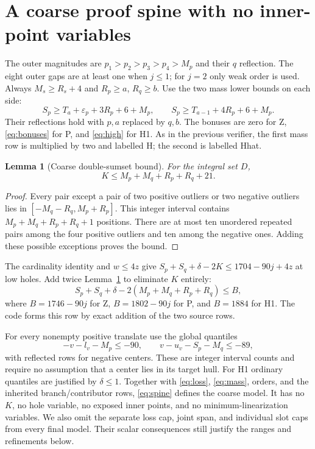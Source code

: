 \documentclass[11pt,a4paper]{article}
\newtheorem{lemma}[theorem]{Lemma}
\begin{document}
\section{A coarse proof spine with no inner-point variables}
The outer magnitudes are $p_1>p_2>p_3>p_4>M_p$ and their $q$ reflection.
The eight outer gaps are at least one when $j\le1$; for $j=2$ only weak
order is used. Always $M_s\ge R_s+4$ and $R_p\ge a$, $R_q\ge b$.
Use the two mass lower bounds on each side:
\begin{equation}\label{eq:mass}
 S_p\ge T_a+\varepsilon_p+3R_p+6+M_p,
 \qquad S_p\ge T_{a-1}+4R_p+6+M_p.
\end{equation}
Their reflections hold with $p,a$ replaced by $q,b$.
The bonuses are zero for Z, \eqref{eq:bonuses} for P, and
\eqref{eq:high} for H1. As in the previous verifier, the first mass row
is multiplied by two and labelled H; the second is labelled Hhat.

\begin{lemma}[Coarse double-sumset bound]\label{lem:coarse}
For the integral set $D$,
\[
 K\le M_p+M_q+R_p+R_q+21.
\]
\end{lemma}
\begin{proof}
Every pair except a pair of two positive outliers or two negative
outliers lies in $[-M_q-R_q,M_p+R_p]$. This integer interval contains
$M_p+M_q+R_p+R_q+1$ positions. There are at most ten unordered repeated
pairs among the four positive outliers and ten among the negative ones.
Adding these possible exceptions proves the bound.
\end{proof}
The cardinality identity and $w\le4z$ give
$S_p+S_q+\delta-2K\le1704-90j+4z$ at low holes.
Add twice Lemma~\ref{lem:coarse} to eliminate $K$ entirely:
\begin{equation}\label{eq:spine}
 \boxed{S_p+S_q+\delta-2(M_p+M_q+R_p+R_q)\le B,}
\end{equation}
where $B=1746-90j$ for Z, $B=1802-90j$ for P, and $B=1884$ for H1.
The code forms this row by exact addition of the two source rows.

For every nonempty positive translate use the global quantiles
\begin{equation}\label{eq:global}
 -v-l_v-M_p\le-90,\qquad v-u_v-S_p-M_q\le-89,
\end{equation}
with reflected rows for negative centers. These are integer interval
counts and require no assumption that a center lies in its target hull.
For H1 ordinary quantiles are justified by $\delta\le1$.
Together with \eqref{eq:loss}, \eqref{eq:mass}, orders, and the inherited
branch/contributor rows, \eqref{eq:spine} defines the coarse model.
It has no $K$, no hole variable, no exposed inner points, and no
minimum-linearization variables. We also omit the separate loss cap,
joint span, and individual slot caps from every final model. Their
scalar consequences still justify the ranges and refinements below.
\end{document}
